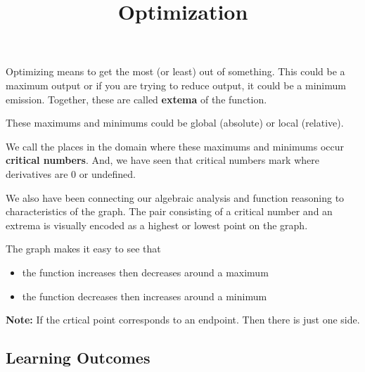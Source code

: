 \documentclass{ximera}
\title{Optimization}
\begin{document}
\begin{abstract}
\end{abstract}
\maketitle








Optimizing means to get the most (or least) out of something.  This could be a maximum output or if you are trying to reduce output, it could be a minimum emission. Together, these are called \textbf{extema} of the function.

These maximums and minimums could be global (absolute) or local (relative).


We call the places in the domain where these maximums and minimums occur \textbf{critical numbers}.  And, we have seen that critical numbers mark where derivatives are $0$ or undefined.


We also have been connecting our algebraic analysis and function reasoning to characteristics of the graph.  The pair consisting of a critical number and an extrema is visually encoded as a highest or lowest point on the graph.

The graph makes it easy to see that 

\begin{itemize}
\item the function increases then decreases around a maximum
\item the function decreases then increases around a minimum
\end{itemize}

\textbf{Note:} If the crtical point corresponds to an endpoint.  Then there is just one side.


















\subsection{Learning Outcomes}
\end{document}
